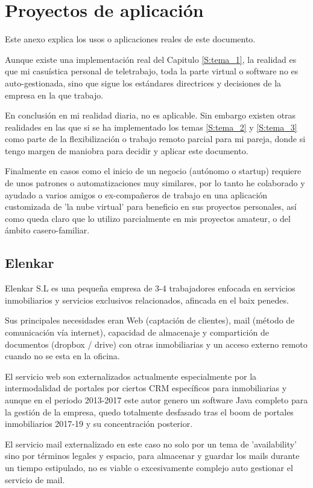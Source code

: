 \chapter{Proyectos de aplicación}\label{S:anexo_F}
Este anexo explica los usos o aplicaciones reales de este documento.

Aunque existe una implementación real del Capitulo \ref{S:tema_1}, la realidad es que mi casuística personal de teletrabajo, toda la parte virtual o software no es auto-gestionada, sino que sigue los estándares directrices y decisiones de la empresa en la que trabajo.

En conclusión en mi realidad diaria, no es aplicable. Sin embargo existen otras realidades en las que si se ha implementado los temas \ref{S:tema_2} y \ref{S:tema_3} como parte de la flexibilización o trabajo remoto parcial para mi pareja, donde si tengo margen de maniobra para decidir y aplicar este documento.

Finalmente en casos como el inicio de un negocio (autónomo o startup) requiere de unos patrones o automatizaciones muy similares, por lo tanto he colaborado y ayudado a varios amigos o ex-compañeros de trabajo en una aplicación customizada de 'la nube virtual' para beneficio en sus proyectos personales, así como queda claro que lo utilizo parcialmente en mis proyectos amateur, o del ámbito casero-familiar.

\section{Elenkar}
Elenkar S.L es una pequeña empresa de 3-4 trabajadores enfocada en servicios inmobiliarios y servicios exclusivos relacionados, afincada en el baix penedes.

Sus principales necesidades eran Web (captación de clientes), mail (método de comunicación vía internet), capacidad de almacenaje y compartición de documentos (dropbox / drive) con otras inmobiliarias y un acceso externo remoto cuando no se esta en la oficina.

El servicio web son externalizados actualmente especialmente por la intermodalidad de portales por ciertos CRM específicos para inmobiliarias y aunque en el periodo 2013-2017 este autor genero un software Java completo para la gestión de la empresa, quedo totalmente desfasado tras el boom de portales inmobiliarios 2017-19 y su concentración posterior.

El servicio mail externalizado en este caso no solo por un tema de 'availability' sino por términos legales y espacio, para almacenar y guardar los mails durante un tiempo estipulado, no es viable o excesivamente complejo auto gestionar el servicio de mail.

